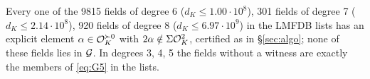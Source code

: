 Every one of the 9815 fields of degree 6 ($d_K\le1.00\cdot10^{8}$), 301 fields of degree 7 ($d_K\le2.14\cdot10^{8}$), 920 fields of degree 8 ($d_K\le6.97\cdot10^{9}$) in the LMFDB lists has an explicit element $\alpha\in\mathcal{O}_K^{\succ 0}$ with $2\alpha\notin\Sigma\mathcal{O}_K^{2}$, certified as in \S\ref{sec:algo}; none of these fields lies in $\mathcal{G}$. In degrees 3, 4, 5 the fields without a witness are exactly the members of \eqref{eq:G5} in the lists.
